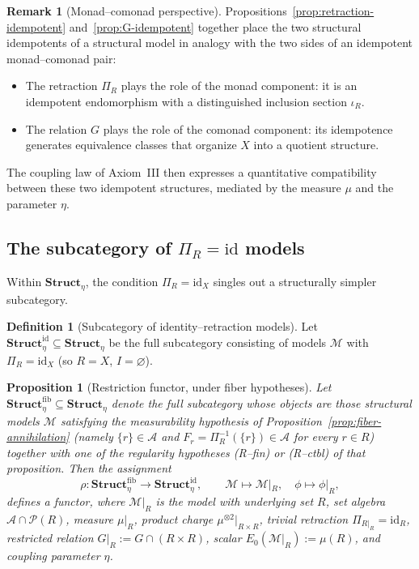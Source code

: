 \documentclass[11pt]{article}
\numberwithin{equation}{section}
\newtheorem{proposition}[theorem]{Proposition}
\theoremstyle{definition}
\newtheorem{definition}[theorem]{Definition}
\newtheorem{remark}[theorem]{Remark}
\begin{document}
\begin{remark}[Monad--comonad perspective]\label{rem:monad-comonad}
Propositions~\ref{prop:retraction-idempotent} and~\ref{prop:G-idempotent} together place the two structural idempotents of a structural model in analogy with the two sides of an idempotent monad--comonad pair:
\begin{itemize}[nosep]
\item The retraction $\Pi_R$ plays the role of the monad component: it is an idempotent endomorphism with a distinguished inclusion section $\iota_R$.
\item The relation $G$ plays the role of the comonad component: its idempotence generates equivalence classes that organize $X$ into a quotient structure.
\end{itemize}
The coupling law of Axiom~III then expresses a quantitative compatibility between these two idempotent structures, mediated by the measure $\mu$ and the parameter $\eta$.
\end{remark}

\subsection{\texorpdfstring{The subcategory of $\Pi_R=\mathrm{id}$ models}{The subcategory of Pi\_R=id models}}

Within $\mathbf{Struct}_{\eta}$, the condition $\Pi_R=\mathrm{id}_X$ singles out a structurally simpler subcategory.

\begin{definition}[Subcategory of identity--retraction models]\label{def:struct-id}
Let $\mathbf{Struct}^{\mathrm{id}}_{\eta}\subseteq\mathbf{Struct}_{\eta}$ be the full subcategory consisting of models $\mathcal M$ with $\Pi_R=\mathrm{id}_X$ (so $R=X$, $I=\varnothing$).
\end{definition}

\begin{proposition}[Restriction functor, under fiber hypotheses]\label{prop:restriction-functor}
Let $\mathbf{Struct}_{\eta}^{\mathrm{fib}}\subseteq\mathbf{Struct}_{\eta}$ denote the full subcategory whose objects are those structural models $\mathcal M$ satisfying the measurability hypothesis of Proposition~\ref{prop:fiber-annihilation} (namely $\{r\}\in\mathcal A$ and $F_r=\Pi_R^{-1}(\{r\})\in\mathcal A$ for every $r\in R$) together with one of the regularity hypotheses \emph{(R--fin)} or \emph{(R--ctbl)} of that proposition. Then the assignment
\[
\rho:\mathbf{Struct}_{\eta}^{\mathrm{fib}}\longrightarrow\mathbf{Struct}^{\mathrm{id}}_{\eta},\qquad
\mathcal M\mapsto\mathcal M|_R,\quad \phi\mapsto\phi|_R,
\]
defines a functor, where $\mathcal M|_R$ is the model with underlying set $R$, set algebra $\mathcal A\cap\mathcal P(R)$, measure $\mu|_R$, product charge $\mu^{\otimes2}|_{R\times R}$, trivial retraction $\Pi_{R|_R}=\mathrm{id}_R$, restricted relation $G|_R:=G\cap(R\times R)$, scalar $E_0(\mathcal M|_R):=\mu(R)$, and coupling parameter $\eta$.
\end{proposition}
\end{document}

